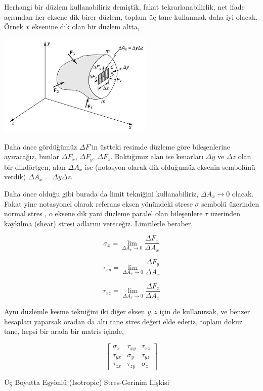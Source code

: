 \documentclass[12pt,fleqn]{article}\usepackage{../../common}
\begin{document}
Herhangi bir düzlem kullanabiliriz demiştik, fakat tekrarlanabilirlik, net ifade
açısından her eksene dik birer düzlem, toplam üç tane kullanmak daha iyi
olacak. Örnek $x$ eksenine dik olan bir düzlem altta,

\includegraphics[width=20em]{phy_020_strs_02_18.jpg}

Daha önce gördüğümüz $\Delta F$'in üstteki resimde düzleme göre bileşenlerine
ayıracağız, bunlar $\Delta F_x$, $\Delta F_y$, $\Delta F_z$. Baktığımız alan ise
kenarları $\Delta y$ ve $\Delta z$ olan bir dikdörtgen, alan $\Delta A_x$ ise
(notasyon olarak dik olduğumüz eksenin sembolünü verdik)
$\Delta A_x = \Delta y \Delta z$.

Daha önce olduğu gibi burada da limit tekniğini kullanabiliriz, $\Delta A_x \to
0$ olacak. Fakat yine notasyonel olarak referans eksen yönündeki strese $\sigma$
sembolü üzerinden normal stres , o eksene dik yani düzleme paralel olan
bileşenlere $\tau$ üzerinden kaykılma (shear) stresi adlarını vereceğiz.
Limitlerle beraber,

$$
\sigma_x = \lim_{\Delta A_x \to 0 } \frac{\Delta F_x}{\Delta A_x}
$$

$$
\tau_{xy} = \lim_{\Delta A_x \to 0 } \frac{\Delta F_y}{\Delta A_x}
$$

$$
\tau_{xz} = \lim_{\Delta A_x \to 0 } \frac{\Delta F_z}{\Delta A_x}
$$

Aynı düzlemle kesme tekniğini iki diğer eksen $y,z$ için de kullanırsak, ve
benzer hesapları yaparsak oradan da altı tane stres değeri elde ederiz, toplam
dokuz tane, hepsi bir arada bir matris içinde,

$$
\left[\begin{array}{rrr}
\sigma_x & \tau_{xy} & \tau_{xz} \\
\tau_{yx} & \sigma_y & \tau_{yz} \\
\tau_{zx} & \tau_{zy} & \sigma_z
\end{array}\right]
$$

Üç Boyutta Eşyönlü (Isotropic) Stres-Gerinim İlişkisi 
\end{document}
